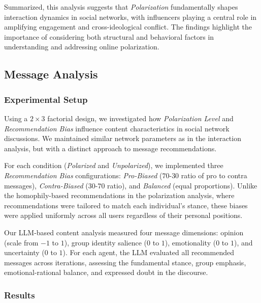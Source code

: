 Summarized, this analysis suggests that \emph{Polarization} fundamentally shapes interaction dynamics in social networks, with influencers playing a central role in amplifying engagement and cross-ideological conflict. The findings highlight the importance of considering both structural and behavioral factors in understanding and addressing online polarization.

\subsection{Message Analysis}
\label{subsec:offline-message-analysis}

\subsubsection{Experimental Setup}

Using a $2\times3$ factorial design, we investigated how \emph{Polarization Level} and \emph{Recommendation Bias} influence content characteristics in social network discussions. We maintained similar network parameters as in the interaction analysis, but with a distinct approach to message recommendations.

For each condition (\emph{Polarized} and \emph{Unpolarized}), we implemented three \emph{Recommendation Bias} configurations: \emph{Pro-Biased} ($70$-$30$ ratio of pro to contra messages), \emph{Contra-Biased} ($30$-$70$ ratio), and \emph{Balanced} (equal proportions). Unlike the homophily-based recommendations in the polarization analysis, where recommendations were tailored to match each individual's stance, these biases were applied uniformly across all users regardless of their personal positions.

Our LLM-based content analysis measured four message dimensions: opinion (scale from $-1$ to $1$), group identity salience ($0$ to $1$), emotionality ($0$ to $1$), and uncertainty ($0$ to $1$). For each agent, the LLM evaluated all recommended messages across iterations, assessing the fundamental stance, group emphasis, emotional-rational balance, and expressed doubt in the discourse.

\subsubsection{Results}

